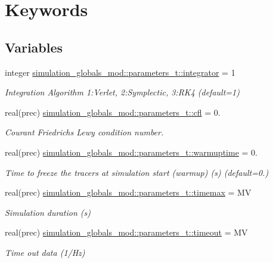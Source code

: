 \hypertarget{group___k_e_y_w_o_r_d_s}{}\section{Keywords}
\label{group___k_e_y_w_o_r_d_s}
\subsection*{Variables}
\begin{DoxyCompactItemize}
\item 
integer \hyperlink{group___k_e_y_w_o_r_d_s_ga4e57d5a1897acaf67eb14e39e3e0cf21}{simulation\+\_\+globals\+\_\+mod\+::parameters\+\_\+t\+::integrator} = 1
\begin{DoxyCompactList}\small\item\em Integration Algorithm 1\+:Verlet, 2\+:Symplectic, 3\+:R\+K4 (default=1) \end{DoxyCompactList}\item 
real(prec) \hyperlink{group___k_e_y_w_o_r_d_s_ga63d8108183b786ec9acf16af2164bda1}{simulation\+\_\+globals\+\_\+mod\+::parameters\+\_\+t\+::cfl} = 0.
\begin{DoxyCompactList}\small\item\em Courant Friedrichs Lewy condition number. \end{DoxyCompactList}\item 
real(prec) \hyperlink{group___k_e_y_w_o_r_d_s_gaed7511e2225ac602d053476e4688d49a}{simulation\+\_\+globals\+\_\+mod\+::parameters\+\_\+t\+::warmuptime} = 0.
\begin{DoxyCompactList}\small\item\em Time to freeze the tracers at simulation start (warmup) (s) (default=0.) \end{DoxyCompactList}\item 
real(prec) \hyperlink{group___k_e_y_w_o_r_d_s_gad09359247decb284f0ec62e1b9a817b0}{simulation\+\_\+globals\+\_\+mod\+::parameters\+\_\+t\+::timemax} = MV
\begin{DoxyCompactList}\small\item\em Simulation duration (s) \end{DoxyCompactList}\item 
real(prec) \hyperlink{group___k_e_y_w_o_r_d_s_gaf4190961e6191cf07a9b04b0b864ec95}{simulation\+\_\+globals\+\_\+mod\+::parameters\+\_\+t\+::timeout} = MV
\begin{DoxyCompactList}\small\item\em Time out data (1/\+Hz) \end{DoxyCompactList}\end{DoxyCompactItemize}


